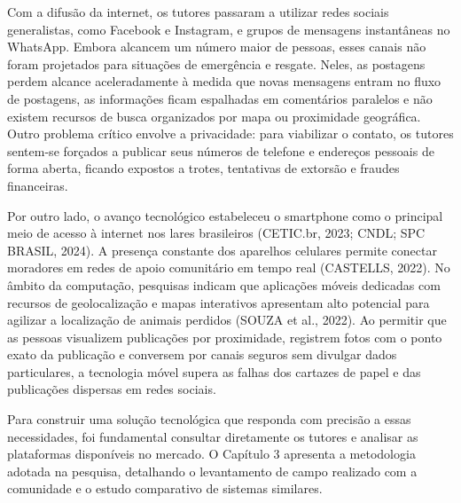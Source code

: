 Com a difusão da internet, os tutores passaram a utilizar redes sociais generalistas, como Facebook e Instagram, e grupos de mensagens instantâneas no WhatsApp. Embora alcancem um número maior de pessoas, esses canais não foram projetados para situações de emergência e resgate. Neles, as postagens perdem alcance aceleradamente à medida que novas mensagens entram no fluxo de postagens, as informações ficam espalhadas em comentários paralelos e não existem recursos de busca organizados por mapa ou proximidade geográfica. Outro problema crítico envolve a privacidade: para viabilizar o contato, os tutores sentem-se forçados a publicar seus números de telefone e endereços pessoais de forma aberta, ficando expostos a trotes, tentativas de extorsão e fraudes financeiras.

Por outro lado, o avanço tecnológico estabeleceu o smartphone como o principal meio de acesso à internet nos lares brasileiros (CETIC.br, 2023; CNDL; SPC BRASIL, 2024). A presença constante dos aparelhos celulares permite conectar moradores em redes de apoio comunitário em tempo real (CASTELLS, 2022). No âmbito da computação, pesquisas indicam que aplicações móveis dedicadas com recursos de geolocalização e mapas interativos apresentam alto potencial para agilizar a localização de animais perdidos (SOUZA et al., 2022). Ao permitir que as pessoas visualizem publicações por proximidade, registrem fotos com o ponto exato da publicação e conversem por canais seguros sem divulgar dados particulares, a tecnologia móvel supera as falhas dos cartazes de papel e das publicações dispersas em redes sociais.

Para construir uma solução tecnológica que responda com precisão a essas necessidades, foi fundamental consultar diretamente os tutores e analisar as plataformas disponíveis no mercado. O Capítulo 3 apresenta a metodologia adotada na pesquisa, detalhando o levantamento de campo realizado com a comunidade e o estudo comparativo de sistemas similares.
\clearpage

